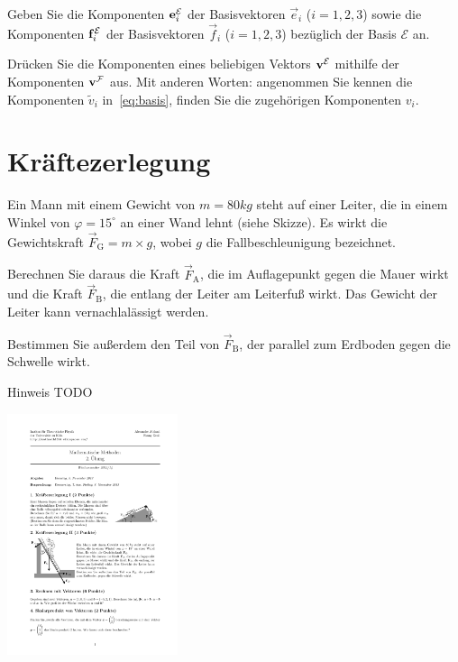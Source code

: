 \documentclass{scrartcl}
\newcommand{\ee}{\vec{e}}
\newcommand{\ff}{\vec{f}}
\begin{document}
\begin{subex}
  \item Geben Sie die Komponenten $\mathbf{e}_i^\mathcal{E}$ der Basisvektoren $\ee_i$ ($i=1,2,3$) sowie die Komponenten $\mathbf{f}_i^\mathcal{E}$ der Basisvektoren $\ff_i$ ($i=1,2,3$) bezüglich der Basis $\mathcal{E}$ an.
  \item Drücken Sie die Komponenten eines beliebigen Vektors $\mathbf{v}^\mathcal{E}$ mithilfe der Komponenten $\mathbf{v}^\mathcal{F}$ aus.
  Mit anderen Worten: angenommen Sie kennen die Komponenten $\tilde{v}_i$ in~\eqref{eq:basis}, finden Sie die zugehörigen Komponenten $v_i$. 
\end{subex}

\section{Kräftezerlegung}
Ein Mann mit einem Gewicht von $m=80\unit{kg}$ steht auf einer Leiter, die in einem Winkel von $\varphi=15^\circ$ an einer Wand lehnt (siehe Skizze).
Es wirkt die Gewichtskraft $\vec{F}_\mathrm{G} = m \times g$, wobei $g$ die Fallbeschleunigung bezeichnet.

Berechnen Sie daraus die Kraft $\vec{F}_\mathrm{A}$, die im Auflagepunkt gegen die Mauer wirkt und die Kraft $\vec{F}_\mathrm{B}$, die entlang der Leiter am Leiterfuß wirkt. Das Gewicht der Leiter kann vernachlalässigt werden.

Bestimmen Sie außerdem den Teil von $\vec{F}_\mathrm{B}$, der parallel zum Erdboden gegen die Schwelle wirkt.

\begin{remark}{Hinweis}
  TODO
\end{remark}

\begin{center}
  \includegraphics[width=5cm,angle=0]{img/ex2_mann.pdf}
\end{center}
\end{document}
